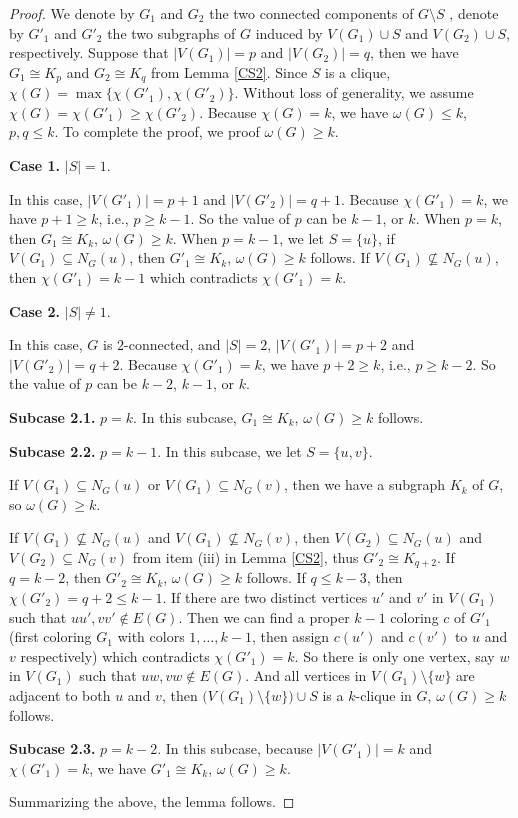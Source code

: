 \documentclass[12pt]{article}
\theoremstyle{definition}
\begin{document}
\begin{proof} We denote by $G_1$ and $G_2$ the two connected components of $G\setminus S$ , denote by $G'_1$ and $G'_2$ the two subgraphs of $G$ induced by $V(G_1)\cup S$ and $V(G_2)\cup S$, respectively. Suppose that $|V(G_1)|=p$ and $|V(G_2)|=q$, then we have $G_1\cong K_p$ and $G_2\cong K_q$ from Lemma \ref{CS2}. Since $S$ is a clique, $\chi(G)=\max\{\chi(G'_1), \chi(G'_2)\}$. Without loss of generality, we assume $\chi(G)=\chi(G'_1)\geq\chi(G'_2)$.
Because $\chi(G)=k$, we have $\omega(G)\leq k$, $p, q\leq k$. To complete the proof, we proof $\omega(G)\geq k$.

{\bf Case 1.} $|S|=1$.

In this case, $|V(G'_1)|=p+1$ and $|V(G'_2)|=q+1$. Because $\chi(G'_1)=k$, we have $p+1\geq k$, i.e., $p\geq k-1$. So the value of $p$ can be $k-1$, or $k$. When $p=k$, then $G_1\cong K_k$, $\omega(G)\geq k$.
When $p=k-1$, we let $S=\{u\}$, if $V(G_1)\subseteq N_G(u)$, then $G'_1\cong K_k$, $\omega(G)\geq k$ follows. If $V(G_1)\not\subseteq N_G(u)$, then $\chi(G'_1)=k-1$ which contradicts $\chi(G'_1)=k$.

{\bf Case 2.} $|S|\neq 1$.

In this case, $G$ is $2$-connected, and $|S|=2$, $|V(G'_1)|=p+2$ and $|V(G'_2)|=q+2$. Because $\chi(G'_1)=k$, we have $p+2\geq k$, i.e., $p\geq k-2$. So the value of $p$ can be $k-2$, $k-1$, or $k$.

{\bf Subcase 2.1.} $p=k$.  In this subcase, $G_1\cong K_k$, $\omega(G)\geq k$ follows.

{\bf Subcase 2.2.} $p=k-1$.  In this subcase, we let $S=\{u,v\}$.

If $V(G_1)\subseteq N_{G}(u)$ or $V(G_1)\subseteq N_{G}(v)$, then we have a subgraph $K_k$ of $G$, so $\omega(G)\geq k$.

If $V(G_1)\not\subseteq N_{G}(u)$ and $V(G_1)\not\subseteq N_{G}(v)$, then $V(G_2)\subseteq N_{G}(u)$ and $V(G_2)\subseteq N_{G}(v)$ from item (iii) in Lemma \ref{CS2}, thus $G'_2\cong K_{q+2}$. If $q=k-2$, then $G'_2\cong K_{k}$, $\omega(G)\geq k$ follows.
If $q\leq k-3$, then $\chi(G'_2)=q+2\leq k-1$. If there are two distinct vertices $u'$ and $v'$ in $V(G_1)$ such that $uu', vv'\not\in E(G)$. Then we can find a proper $k-1$ coloring $c$ of $G'_1$ (first coloring $G_1$ with colors $1,\ldots, k-1$, then assign $c(u')$ and $c(v')$ to $u$ and $v$ respectively) which contradicts $\chi(G'_1)=k$. So there is only one vertex, say $w$ in $V(G_1)$ such that $uw, vw\not\in E(G)$. And all vertices
in $V(G_1)\setminus\{w\}$ are adjacent to both $u$ and $v$, then $\big(V(G_1)\setminus\{w\}\big)\cup S$  is a $k$-clique in $G$, $\omega(G)\geq k$ follows.

{\bf Subcase 2.3.} $p=k-2$. In this subcase, because  $|V(G'_1)|=k$ and $\chi(G'_1)=k$, we have $G'_1\cong K_k$, $\omega(G)\geq k$.

Summarizing the above, the lemma follows.
\end{proof}
\end{document}
